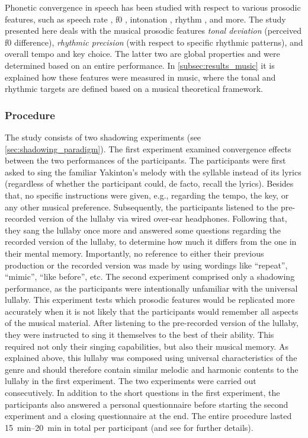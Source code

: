 Phonetic convergence in speech has been studied with respect to various prosodic features, such as speech rate \citep{Schweitzer2013convergence, Pardo2012phonetic}, \ac{f0} \citep{Babel2012role, Collins1998convergence}, intonation \citep{DImperio2014phonetic, Simonet2011intonational}, rhythm \citep{Krivokapic2013rhythm}, and more.
The study presented here deals with the musical prosodic features \emph{tonal deviation} (perceived \ac{f0} difference), \emph{rhythmic precision} (with respect to specific rhythmic patterns), and overall tempo and key choice.
The latter two are global properties and were determined based on an entire performance.
In \cref{subsec:results_music} it is explained how these features were measured in music, where the tonal and rhythmic targets are defined based on a musical theoretical framework.

\subsubsection{Procedure}
\label{subsubsec:procedure_music}

The study consists of two shadowing experiments (see \cref{sec:shadowing_paradigm}).
The first experiment examined convergence effects between the two performances of the participants.
The participants were first asked to sing the familiar Yakinton's melody with the syllable \textipa{[na]} instead of its lyrics (regardless of whether the participant could, de facto, recall the lyrics).
Besides that, no specific instructions were given, e.g., regarding the tempo, the key, or any other musical preference.
Subsequently, the participants listened to the pre-recorded version of the lullaby via wired over-ear headphones. %
Following that, they sang the lullaby once more and answered some questions regarding the recorded version of the lullaby, to determine how much it differs from the one in their mental memory.
Importantly, no reference to either their previous production or the recorded version was made by using wordings like \enquote{repeat}, \enquote{mimic}, \enquote{like before}, etc.
The second experiment comprised only a shadowing performance, as the participants were intentionally unfamiliar with the universal lullaby.
This experiment tests which prosodic features would be replicated more accurately when it is not likely that the participants would remember all aspects of the musical material.
After listening to the pre-recorded version of the lullaby, they were instructed to sing it themselves to the best of their ability.
This required not only their singing capabilities, but also their musical memory.
As explained above, this lullaby was composed using universal characteristics of the genre and should therefore contain similar melodic and harmonic contents to the lullaby in the first experiment.
The two experiments were carried out consecutively.
In addition to the short questions in the first experiment, the participants also answered a personal questionnaire before starting the second experiment and a closing questionnaire at the end.
The entire procedure lasted \SIrange{15}{20}{\minute} in total per participant (and see \citet{Raveh2020SpeechProsody} for further details).

